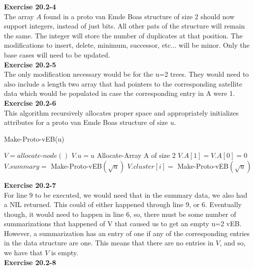 \documentclass{article}
\begin{document}
\noindent\textbf{Exercise 20.2-4}\\

The array $A$ found in a proto van Emde Boas structure of size 2 should now support integers, instead of just bits.  All other pats of the structure will remain the same.  The integer will store the number of duplicates at that position.  The modifications to insert, delete, minimum, successor, etc... will be minor.  Only the base cases will need to be updated. \\

\noindent\textbf{Exercise 20.2-5}\\

The only modification necessary would be for the u=2 trees. They would need to also include a length two array that had pointers to the corresponding satellite data which would be populated in case the corresponding entry in A were 1.\\

\noindent\textbf{Exercise 20.2-6}\\

This algorithm recursively allocates proper space and appropriately initializes attributes for a proto van Emde Boas structure of size $u$. \\
\begin{algorithm}
\caption{Make-Proto-vEB(u)}
\begin{algorithmic}
\State $V = allocate$-$node()$
\State $V.u = u$
	\State Allocate-Array A of size 2
	\State $V.A[1] = V.A[0] = 0$
\Else
	\State $V.summary =$ Make-Proto-vEB$(\sqrt{u})$
		\State $V.cluster[i] = $ Make-Proto-vEB$(\sqrt{u})$
	\EndFor
\EndIf
\end{algorithmic}
\end{algorithm}

\noindent\textbf{Exercise 20.2-7}\\

For line 9 to be executed, we would need that in the summary data, we also had a NIL returned. This could of either happened through line 9, or 6. Eventually though, it would need to happen in line 6, so, there must be some number of summarizations that happened of V that caused us to get an empty u=2 vEB. However, a summarization has an entry of one if any of the corresponding entries in the data structure are one. This means that there are no entries in $V$, and so, we have that $V$ is empty.\\

\noindent\textbf{Exercise 20.2-8}\\
\end{document}
